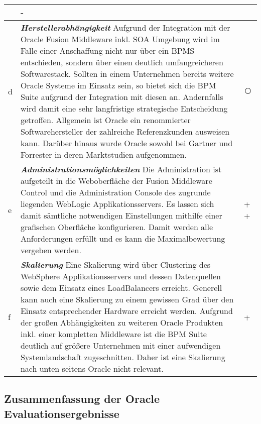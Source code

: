 \begin{longtabu}{@{\extracolsep{\fill}}|p{0.5cm}|X|p{2cm}|}
 & \centering\arraybackslash \textcircled{-} \tabularnewline
\hline
 d 
 & \textit{\textbf{Herstellerabhängigkeit}} \newline  Aufgrund der Integration mit der Oracle Fusion Middleware inkl. SOA Umgebung wird im Falle einer Anschaffung nicht nur über ein \ac{BPMS} entschieden, sondern über einen deutlich umfangreicheren Softwarestack. Sollten in einem Unternehmen bereits weitere Oracle Systeme im Einsatz sein, so bietet sich die BPM Suite aufgrund der Integration mit diesen an. Andernfalls wird damit eine sehr langfristige strategische Entscheidung getroffen. Allgemein ist Oracle ein renommierter Softwarehersteller der zahlreiche Referenzkunden ausweisen kann. Darüber hinaus wurde Oracle sowohl bei Gartner und Forrester in deren Marktstudien aufgenommen. \cite{Gartner.2012}\cite{Forresterresearchinc.2013} \smallskip
 & \centering\arraybackslash \textcircled{} \tabularnewline
\hline
 e 
 & \textit{\textbf{Administrationsmöglichkeiten}} \newline  Die Administration ist aufgeteilt in die Weboberfläche der Fusion Middleware Control und die Administration Console des zugrunde liegenden WebLogic Applikationsservers. Es lassen sich damit sämtliche notwendigen Einstellungen mithilfe einer grafischen Oberfläche konfigurieren. Damit werden alle Anforderungen erfüllt und es kann die Maximalbewertung vergeben werden. \smallskip
 & \centering\arraybackslash \textcircled{+} \textcircled{+} \tabularnewline
\hline
 f 
 & \textit{\textbf{Skalierung}} \newline  Eine Skalierung wird über Clustering des WebSphere Applikationsservers und dessen Datenquellen sowie dem Einsatz eines LoadBalancers erreicht. Generell kann auch eine Skalierung zu einem gewissen Grad über den Einsatz entsprechender Hardware erreicht werden. Aufgrund der großen Abhängigkeiten zu weiteren Oracle Produkten inkl. einer kompletten Middleware ist die BPM Suite deutlich auf größere Unternehmen mit einer aufwendigen Systemlandschaft zugeschnitten. Daher ist eine Skalierung nach unten seitens Oracle nicht relevant.
  \smallskip
 & \centering\arraybackslash \textcircled{+}  \tabularnewline
\hline
\end{longtabu}
\normalsize


\subsection{Zusammenfassung der Oracle Evaluationsergebnisse}

